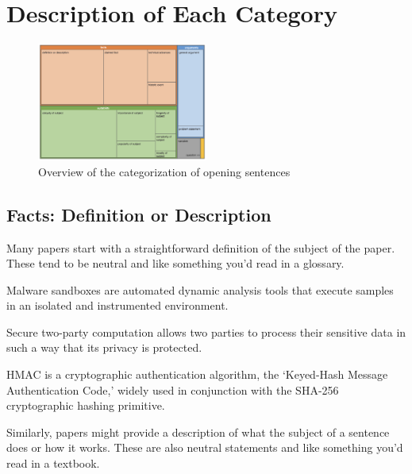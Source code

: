 \documentclass[sigconf]{acmart}
\begin{document}

	\maketitle
	
\section{Description of Each Category}
\begin{figure}[t]
	\centering
	\includegraphics[width=0.5\textwidth]{image.png}
	\caption{Overview of the categorization of opening sentences}
	\label{fig:overview}
\end{figure}
\subsection{Facts: Definition or Description}
	
Many papers start with a straightforward definition of the subject of the paper. These tend to be neutral and like something you’d read in a glossary.
	
Malware sandboxes are automated dynamic analysis tools that execute samples in an isolated and instrumented environment.
	
Secure two-party computation allows two parties to process their sensitive data in such a way that its privacy is protected.
	
	HMAC is a cryptographic authentication algorithm, the ‘Keyed-Hash Message Authentication Code,’ widely used in conjunction with the SHA-256 cryptographic hashing primitive.
	
	Similarly, papers might provide a description of what the subject of a sentence does or how it works. These are also neutral statements and like something you’d read in a textbook. 
	
\end{document}
